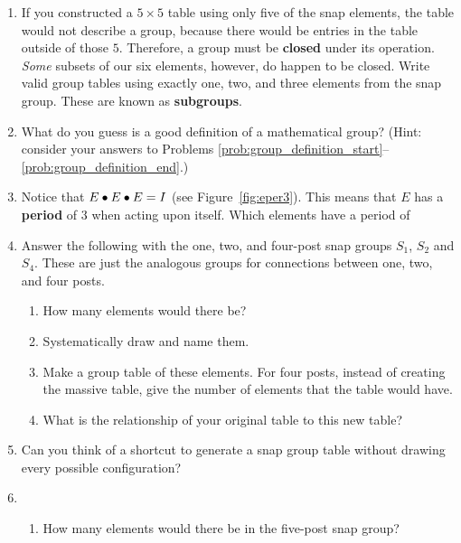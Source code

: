 \documentclass[../textbook.tex]{subfiles}
\begin{document}
\begin{enumerate}
\setcounter{enumi}{\value{some_name}}
\item If you constructed a $5\times 5$ table using only five of the snap elements, the table would not describe a group, because there would be entries in the table outside of those $5$. Therefore, a group must be \textbf{closed} under its operation. \textit{Some} subsets of our six elements, however, do happen to be closed. Write valid group tables using exactly one, two, and three elements from the snap group. These are known as \textbf{subgroups}.\label{prob:group_definition_end}
\item What do you guess is a good definition of a mathematical group? (Hint: consider your answers to Problems \ref{prob:group_definition_start}--\ref{prob:group_definition_end}.)
\item Notice that $E\bullet E\bullet E=I$ (see Figure~\ref{fig:eper3}). This means that $E$ has a \textbf{period} of $3$ when acting upon itself. Which elements have a period of
\begin{enumerate}
\end{enumerate}
\item Answer the following with the one, two, and four-post snap groups $S_1$, $S_2$ and $S_4$. These are just the analogous groups for connections between one, two, and four posts. \begin{enumerate}
\item How many elements would there be?
\item Systematically draw and name them.
\item Make a group table of these elements. For four posts, instead of creating the massive table, give the number of elements that the table would have.
\item What is the relationship of your original table to this new table?
\end{enumerate}
\item Can you think of a shortcut to generate a snap group table without drawing every possible configuration?
\item \begin{enumerate}
\item How many elements would there be in the five-post snap group? \label{prob:five_post_snap_list_start}

\end{enumerate}
\end{enumerate}
\end{document}
